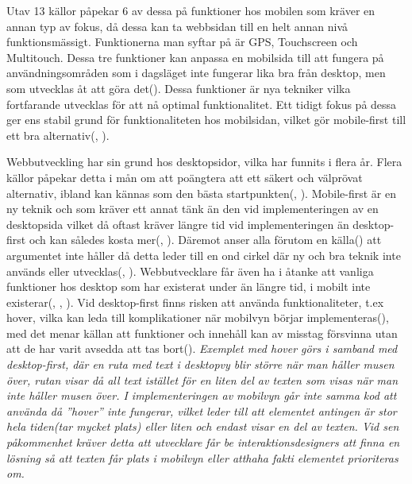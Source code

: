 \documentclass[11pt]{article}
\begin{document}
 Utav 13 källor påpekar 6 av dessa på funktioner hos mobilen som kräver en annan typ av fokus, då dessa kan ta webbsidan till en helt annan nivå funktionsmässigt. Funktionerna man syftar på är GPS, Touchscreen och Multitouch. Dessa tre funktioner kan anpassa en mobilsida till att fungera på användningsområden som i dagsläget inte fungerar lika bra från desktop, men som utvecklas åt att göra det(\cite{sweclock}). Dessa funktioner är nya tekniker vilka fortfarande utvecklas för att nå optimal funktionalitet. Ett tidigt fokus på dessa ger ens stabil grund för funktionaliteten hos mobilsidan, vilket gör mobile-first till ett bra alternativ(\cite{techradar}, \cite{othermedia}).
 
 Webbutveckling har sin grund hos desktopsidor, vilka har funnits i flera år. Flera källor påpekar detta i mån om att poängtera att ett säkert och välprövat alternativ, ibland kan kännas som den bästa startpunkten(\cite{armstrong}, \cite{readyartwork}). Mobile-first är en ny teknik och som kräver ett annat tänk än den vid implementeringen av en desktopsida vilket då oftast kräver längre tid vid implementeringen än desktop-first och kan således kosta mer(\cite{readyartwork}, \cite{marcuspope}). Däremot anser alla förutom en källa(\cite{armstrong}) att argumentet inte håller då detta leder till en ond cirkel där ny och bra teknik inte används eller utvecklas(\cite{designshack}, \cite{marcuspope}). Webbutvecklare får även ha i åtanke att vanliga funktioner hos desktop som har existerat under än längre tid, i mobilt inte existerar(\cite{responsivedesign}, \cite{designshack}, \cite{webinsation}). Vid desktop-first finns risken att använda funktionaliteter, t.ex hover, vilka kan leda till komplikationer när mobilvyn börjar implementeras(\cite{readyartwork}), med det menar källan att funktioner och innehåll kan av misstag försvinna utan att de har varit avsedda att tas bort(\cite{readyartwork}). \textit{Exemplet med hover görs i samband med desktop-first, där en ruta med text i desktopvy blir större när man håller musen över, rutan visar då all text istället för en liten del av texten som visas när man inte håller musen över. I implementeringen av mobilvyn går inte samma kod att använda då ”hover” inte fungerar, vilket leder till att elementet antingen är stor hela tiden(tar mycket plats) eller liten och endast visar en del av texten. Vid sen påkommenhet kräver detta att utvecklare får be interaktionsdesigners att finna en lösning så att texten får plats i mobilvyn eller atthaha fakti elementet prioriteras om.}
 
\end{document}
